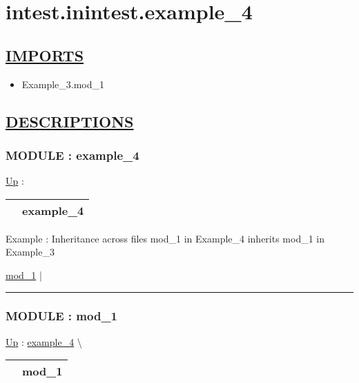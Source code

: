 \chapter*{intest.inintest.example\_4}
\hypertarget{ecldoc:toc:intest.inintest.example_4}{}

\section*{\underline{IMPORTS}}
\begin{itemize}
\item Example\_3.mod\_1
\end{itemize}

\section*{\underline{DESCRIPTIONS}}
\subsection*{MODULE : example\_4}
\hypertarget{ecldoc:intest.inintest.example_4}{}
\hyperlink{ecldoc:toc:intest/inintest}{Up} :

{\renewcommand{\arraystretch}{1.5}
\begin{tabularx}{\textwidth}{|>{\raggedright\arraybackslash}l|X|}
\hline
\hspace{0pt} & example\_4 \\
\hline
\end{tabularx}
}

\par
Example : Inheritance across files mod\_1 in Example\_4 inherits mod\_1 in Example\_3


\hyperlink{ecldoc:intest.inintest.example_4.mod_1}{mod\_1}  |

\rule{\linewidth}{0.5pt}

\subsection*{MODULE : mod\_1}
\hypertarget{ecldoc:intest.inintest.example_4.mod_1}{}
\hyperlink{ecldoc:intest.inintest.example_4}{Up} :
\hspace{0pt} \hyperlink{ecldoc:intest.inintest.example_4}{example_4} \textbackslash 

{\renewcommand{\arraystretch}{1.5}
\begin{tabularx}{\textwidth}{|>{\raggedright\arraybackslash}l|X|}
\hline
\hspace{0pt} & mod\_1 \\
\hline
\end{tabularx}
}

